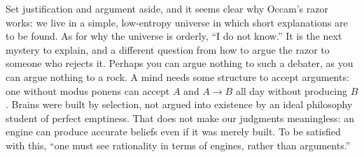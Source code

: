Set justification and argument aside, and it seems clear why Occam's razor works: we live in a simple, low-entropy universe in which short explanations are to be found. As for why the universe is orderly, ``I do not know.'' It is the next mystery to explain, and a different question from how to argue the razor to someone who rejects it. Perhaps you can argue nothing to such a debater, as you can argue nothing to a rock. A mind needs some structure to accept arguments: one without modus ponens can accept $A$ and $A \to B$ all day without producing $B$.  Brains were built by selection, not argued into existence by an ideal philosophy student of perfect emptiness. That does not make our judgments meaningless: an engine can produce accurate beliefs even if it was merely built. To be satisfied with this, ``one must see rationality in terms of engines, rather than arguments.'' 
